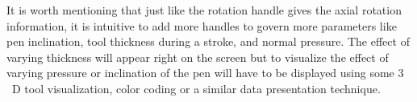     It is worth mentioning that just like the rotation handle gives the axial rotation information, it is intuitive to add more handles to govern more parameters like pen inclination, tool thickness during a stroke, and normal pressure. The effect of varying thickness will appear right on the screen but to visualize the effect of varying pressure or inclination of the pen will have to be displayed using some $3$~D tool visualization, color coding or a similar data presentation technique.
